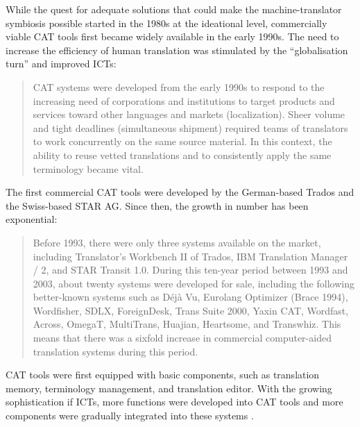 While the quest for adequate solutions that could make the machine-translator symbiosis possible started in the 1980s at the ideational level, commercially viable CAT tools first became widely available in the early 1990s. The need to increase the efficiency of human translation was stimulated by the ``globalisation turn'' \citep{snell2006turns} and improved ICTs:
\begin{quote}
    CAT systems were developed from the early 1990s to respond to the increasing need of corporations and institutions to target products and services toward other languages and markets (localization). Sheer volume and tight deadlines (simultaneous shipment) required teams of translators to work concurrently on the same source material. In this context, the ability to reuse vetted translations and to consistently apply the same terminology became vital. \citep[63]{garcia2015computer}
\end{quote}
The first commercial CAT tools were developed by the German-based Trados and the Swiss-based STAR AG. Since then, the growth in number has been exponential:
\begin{quote}
    Before 1993, there were only three systems available on the market, including Translator’s Workbench II of Trados, IBM Translation Manager / 2, and STAR Transit 1.0. During this ten-year period between 1993 and 2003, about twenty systems were developed for sale, including the following better-known systems such as Déjà Vu, Eurolang Optimizer (Brace 1994), Wordfisher, SDLX, ForeignDesk, Trans Suite 2000, Yaxin CAT, Wordfast, Across, OmegaT, MultiTrans, Huajian, Heartsome, and Transwhiz. This means that there was a sixfold increase in commercial computer-aided translation systems during this period. \citep[8]{chan2015}
\end{quote}
CAT tools were first equipped with basic components, such as translation memory, terminology management, and translation editor. With the growing sophistication if ICTs, more functions were developed into CAT tools and more components were gradually integrated into these systems \citep[12]{chan2015}.

